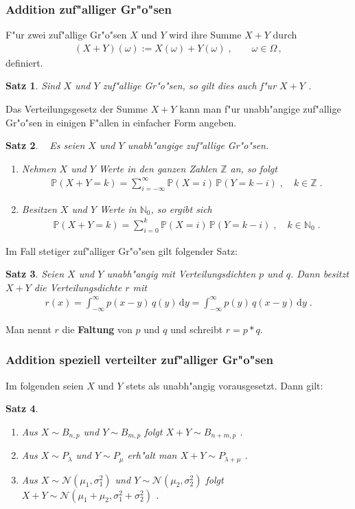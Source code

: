 \documentclass[ngerman,draft,parskip=half,twoside]{scrartcl}
\newtheorem{thm}{Satz}[section]
\newcommand*{\N}{\mathbb{N}}      %
\newcommand*{\Z}{\mathbb{Z}}      %
\newcommand*{\WKM}{\mathbb{P}}      %
\begin{document}
\subsubsection{Addition zuf"alliger Gr"o"sen}
F"ur zwei zuf"allige Gr"o"sen $X$  und $Y$ wird ihre Summe $X+Y$ durch
\begin{gather*}
  (X+Y)(\omega):=X(\omega)+Y(\omega)\;,\qquad \omega\in\Omega\,,
\end{gather*}
definiert.
\begin{thm}
Sind $X$ und $Y$ zuf"allige Gr"o"sen, so gilt dies auch f"ur $X+Y$ .
\end{thm}
Das Verteilungsgesetz der Summe $X+Y$ kann man f"ur unabh"angige zuf"allige Gr"o"sen in einigen
F"allen in einfacher Form angeben.
\begin{thm}~
Es seien $X$ und $Y$ unabh"angige zuf"allige Gr"o"sen.
\begin{enumerate}
\item
Nehmen $X$ und $Y$ Werte in den ganzen Zahlen $\Z$ an, so folgt
  \begin{gather*}
    \WKM(X+Y=k)=\sum_{i=-\infty}^\infty\WKM(X=i)\,\WKM(Y=k-i)\;,\quad k\in \Z\;.
  \end{gather*}
\item
Besitzen $X$ und $Y$ Werte in $\N_0$, so ergibt sich
  \begin{gather*}
    \WKM(X+Y=k)=\sum_{i=0}^k\WKM(X=i)\,\WKM(Y=k-i)\;,\quad k\in \N_0\;.
  \end{gather*}
\end{enumerate}
\end{thm}
Im Fall stetiger zuf"alliger Gr"o"sen gilt folgender Satz:
\begin{thm}
Seien $X$ und $Y$ unabh"angig mit Verteilungsdichten $p$ und $q$. Dann besitzt $X+Y$
die Verteilungsdichte $r$  mit
  \begin{gather*}
    r(x)=\int_{-\infty}^\infty p(x-y)\,q(y)\,\mathrm d y = \int_{-\infty}^\infty p(y)\,q(x-y)\,\mathrm d y \;.
  \end{gather*}
\end{thm}
Man nennt $r$ die \textbf{Faltung} von $p$ und $q$ und schreibt $r=p*q$.
\subsubsection{Addition speziell verteilter zuf"alliger Gr"o"sen}
Im folgenden seien $X$ und $Y$ stets als unabh"angig vorausgesetzt. Dann gilt:
\begin{thm}~
  \begin{enumerate}[label=(\alph*)]
   \item
Aus $X\sim B_{n,p}$ und $Y\sim B_{m,p}$ folgt $X+Y\sim B_{n+m,p}$  .
   \item
Aus $X\sim P_\lambda$ und $Y\sim P_\mu$ erh"alt man $X+Y\sim P_{\lambda+\mu}$ .
   \item
Aus $X\sim\mathcal N(\mu_1,\sigma_1^2)$ und $Y\sim\mathcal N(\mu_2,\sigma_2^2)$ folgt
$X+Y\sim \mathcal N(\mu_1+\mu_2,\sigma_1^2+\sigma_2^2)$ .
  \end{enumerate}
\end{thm}
\end{document}
